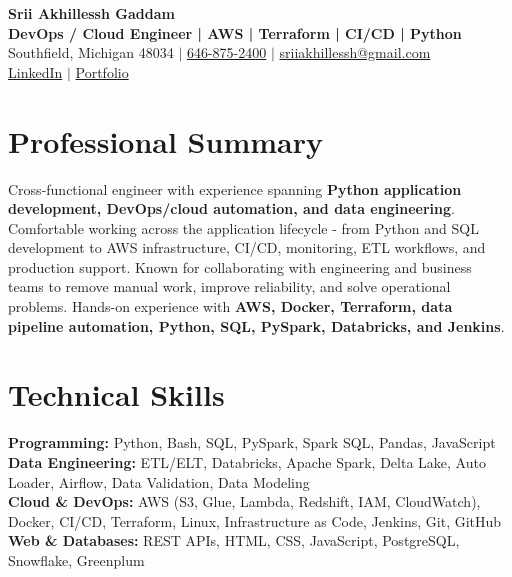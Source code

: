 \documentclass[letterpaper,10pt]{article}
\begin{document}
\fontsize{9.35pt}{10.45pt}\selectfont

\begin{center}
    {\LARGE \textbf{Srii Akhillessh Gaddam}} \\[-1pt]
    \textbf{DevOps / Cloud Engineer | AWS | Terraform | CI/CD | Python} \\[2pt]
    Southfield, Michigan 48034 $|$
    \href{tel:6468752400}{646-875-2400} $|$
    \href{mailto:sriiakhillessh@gmail.com}{sriiakhillessh@gmail.com} \\[1pt]
    \href{https://www.linkedin.com/in/srii-akhiilessh-gaddam-b48668191/}{LinkedIn} $|$
    \href{https://sriiakhillesshg.github.io/portfolio/}{Portfolio}
\end{center}
\vspace{-8pt}

\section{Professional Summary}
\small{Cross-functional engineer with experience spanning \textbf{Python application development, DevOps/cloud automation, and data engineering}. Comfortable working across the application lifecycle - from Python and SQL development to AWS infrastructure, CI/CD, monitoring, ETL workflows, and production support. Known for collaborating with engineering and business teams to remove manual work, improve reliability, and solve operational problems. Hands-on experience with \textbf{AWS, Docker, Terraform, data pipeline automation, Python, SQL, PySpark, Databricks, and Jenkins}.}

\section{Technical Skills}
\small{
\textbf{Programming:} Python, Bash, SQL, PySpark, Spark SQL, Pandas, JavaScript \\
\textbf{Data Engineering:} ETL/ELT, Databricks, Apache Spark, Delta Lake, Auto Loader, Airflow, Data Validation, Data Modeling \\
\textbf{Cloud \& DevOps:} AWS (S3, Glue, Lambda, Redshift, IAM, CloudWatch), Docker, CI/CD, Terraform, Linux, Infrastructure as Code, Jenkins, Git, GitHub \\
\textbf{Web \& Databases:} REST APIs, HTML, CSS, JavaScript, PostgreSQL, Snowflake, Greenplum
}
\end{document}
